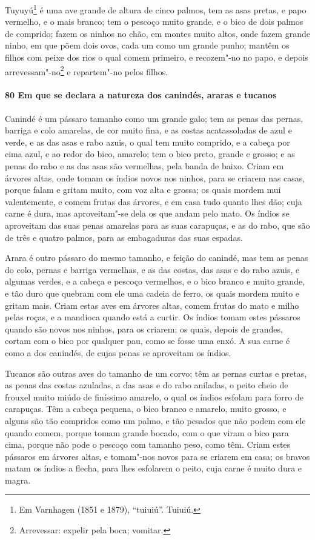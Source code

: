 \begin{linenumbers}
Tuyuyú\footnote{ Em Varnhagen (1851 e 1879), ``tuiuiú''. Tuiuiú.} é uma ave grande de
altura de cinco palmos, tem as asas pretas, e papo vermelho, e o mais branco; tem o
pescoço muito grande, e o bico de dois palmos de comprido; fazem os ninhos no chão, em
montes muito altos, onde fazem grande ninho, em que põem dois ovos, cada um como um grande
punho; mantêm os filhos com peixe dos rios o qual comem primeiro, e recozem"-no no papo, e
depois arrevessam"-no\footnote{ Arrevessar: expelir pela boca; vomitar.} e repartem"-no
pelos filhos.

\paragraph{80 Em que se declara a natureza dos canindés, araras e tucanos}\quad
Canindé é um pássaro tamanho como um grande galo; tem as penas das pernas, barriga e colo
amarelas, de cor muito fina, e as costas acatassoladas de azul e verde, e as das asas e
rabo azuis, o qual tem muito comprido, e a cabeça por cima azul, e ao redor do bico,
amarelo; tem o bico preto, grande e grosso; e as penas do rabo e as das asas são
vermelhas, pela banda de baixo. Criam em árvores altas, onde tomam os índios novos nos
ninhos, para se criarem nas casas, porque falam e gritam muito, com voz alta e grossa; os
quais mordem mui valentemente, e comem frutas das árvores, e em casa tudo quanto lhes dão;
cuja carne é dura, mas aproveitam"-se dela os que andam pelo mato. Os índios se aproveitam
das suas penas amarelas para as suas carapuças, e as do rabo, que são de três e quatro
palmos, para as embagaduras das suas espadas.

Arara é outro pássaro do mesmo tamanho, e feição do canindé, mas tem as penas do colo,
pernas e barriga vermelhas, e as das costas, das asas e do rabo azuis, e algumas verdes, e
a cabeça e pescoço vermelhos, e o bico branco e muito grande, e tão duro que quebram com
ele uma cadeia de ferro, os quais mordem muito e gritam mais. Criam estas aves em árvores
altas, comem frutas do mato e milho pelas roças, e a mandioca quando está a curtir. Os
índios tomam estes pássaros quando são novos nos ninhos, para os criarem; os quais, depois
de grandes, cortam com o bico por qualquer pau, como se fosse uma enxó. A sua carne é como
a dos canindés, de cujas penas se aproveitam os índios.

Tucanos são outras aves do tamanho de um corvo; têm as pernas curtas e pretas, as penas
das costas azuladas, a das asas e do rabo aniladas, o peito cheio de frouxel muito miúdo
de finíssimo amarelo, o qual os índios esfolam para forro de carapuças. Têm a cabeça
pequena, o bico branco e amarelo, muito grosso, e alguns são tão compridos como um palmo,
e tão pesados que não podem com ele quando comem, porque tomam grande bocado, com o que
viram o bico para cima, porque não pode o pescoço com tamanho peso, como têm. Criam estes
pássaros em árvores altas, e tomam"-nos novos para se criarem em casa; os bravos matam os
índios a flecha, para lhes esfolarem o peito, cuja carne é muito dura e magra.


\end{linenumbers}

